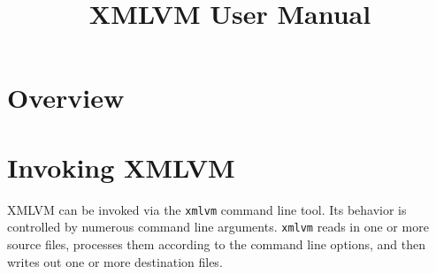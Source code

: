 \documentclass[12pt]{article}
\title{XMLVM User Manual}
\date{}
\newcommand{\xmlvm}{\texttt{xmlvm} }
\begin{document}
\maketitle 

\section{Overview}


\section{Invoking XMLVM}

XMLVM can be invoked via the \xmlvm command line tool. Its behavior is
controlled by numerous command line arguments. \xmlvm reads in one or
more source files, processes them according to the command line
options, and then writes out one or more destination files.
\end{document}
